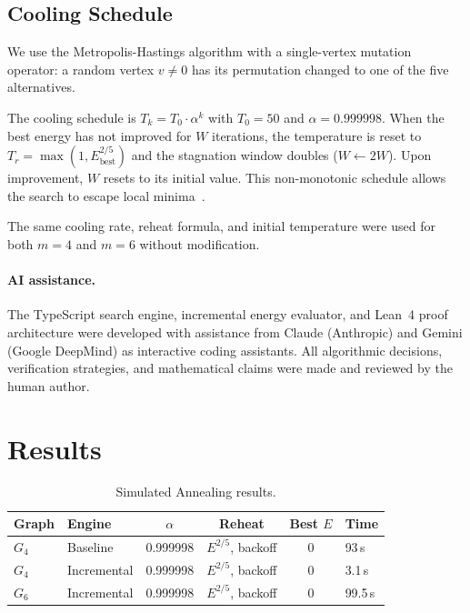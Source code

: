 \documentclass[11pt]{article}
\theoremstyle{plain}
\begin{document}
\subsection{Cooling Schedule}

We use the Metropolis-Hastings algorithm with a single-vertex mutation
operator: a random vertex $v \ne 0$ has its permutation changed to one of
the five alternatives.

The cooling schedule is $T_k = T_0 \cdot \alpha^k$ with $T_0 = 50$ and
$\alpha = 0.999998$. When the best energy has not improved for $W$
iterations, the temperature is reset to
$T_r = \max(1, E_{\text{best}}^{2/5})$ and the stagnation window doubles
($W \leftarrow 2W$). Upon improvement, $W$ resets to its initial value.
This non-monotonic schedule allows the search to escape local
minima~\cite{kirkpatrick1983,marinari1992}.

The same cooling rate, reheat formula, and initial temperature were used
for both $m=4$ and $m=6$ without modification.

\paragraph{AI assistance.}
The TypeScript search engine, incremental energy evaluator, and Lean~4 proof
architecture were developed with assistance from Claude (Anthropic) and
Gemini (Google DeepMind) as interactive coding assistants. All algorithmic
decisions, verification strategies, and mathematical claims were made and
reviewed by the human author.

\section{Results}

\begin{table}[h]
\centering
\caption{Simulated Annealing results.}
\label{tab:results}
\begin{tabular}{@{}llcccl@{}}
\toprule
Graph & Engine & $\alpha$ & Reheat & Best $E$ & Time \\
\midrule
$G_4$ & Baseline & 0.999998 & $E^{2/5}$, backoff & 0 & 93\,s \\
$G_4$ & Incremental & 0.999998 & $E^{2/5}$, backoff & 0 & 3.1\,s \\
$G_6$ & Incremental & 0.999998 & $E^{2/5}$, backoff & 0 & 99.5\,s \\
\bottomrule
\end{tabular}
\end{table}
\end{document}
